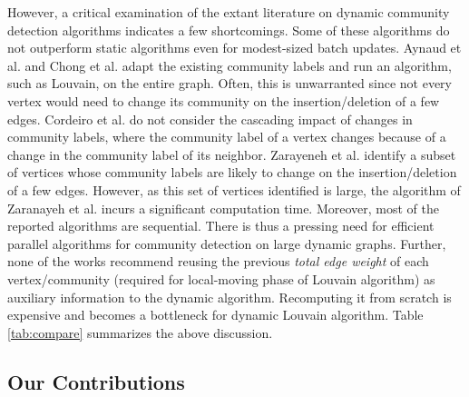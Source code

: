 However, a critical examination of the extant literature on dynamic community detection algorithms indicates a few shortcomings. Some of these algorithms \cite{com-cordeiro16, com-meng16} do not outperform static algorithms even for modest-sized batch updates. Aynaud et al. \cite{com-aynaud10} and Chong et al. \cite{com-chong13} adapt the existing community labels and run an algorithm, such as Louvain, on the entire graph. Often, this is unwarranted since not every vertex would need to change its community on the insertion/deletion of a few edges. Cordeiro et al. \cite{com-cordeiro16} do not consider the cascading impact of changes in community labels, where the community label of a vertex changes because of a change in the community label of its neighbor. Zarayeneh et al. \cite{com-zarayeneh21} identify a subset of vertices whose community labels are likely to change on the insertion/deletion of a few edges. However, as this set of vertices identified is large, the algorithm of Zaranayeh et al. incurs a significant computation time. Moreover, most of the reported algorithms \cite{com-aynaud10, com-chong13, com-meng16, com-cordeiro16, com-zhuang19, com-zarayeneh21} are sequential. There is thus a pressing need for efficient parallel algorithms for community detection on large dynamic graphs. Further, none of the works recommend reusing the previous \textit{total edge weight} of each vertex/community (required for local-moving phase of Louvain algorithm) as auxiliary information to the dynamic algorithm. Recomputing it from scratch is expensive and becomes a bottleneck for dynamic Louvain algorithm. Table \ref{tab:compare} summarizes the above discussion.






\subsection{Our Contributions}

